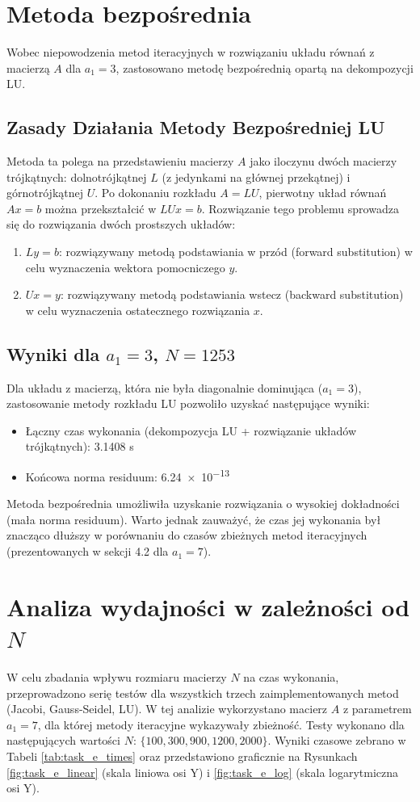 \documentclass[a4paper, 11pt]{article}
\begin{document}
\section{Metoda bezpośrednia}
Wobec niepowodzenia metod iteracyjnych w rozwiązaniu układu równań z macierzą $A$ dla $a_1=3$, zastosowano metodę bezpośrednią opartą na dekompozycji LU.

\subsection{Zasady Działania Metody Bezpośredniej LU}
Metoda ta polega na przedstawieniu macierzy $A$ jako iloczynu dwóch macierzy trójkątnych: dolnotrójkątnej $L$ (z jedynkami na głównej przekątnej) i górnotrójkątnej $U$. Po dokonaniu rozkładu $A = LU$, pierwotny układ równań $Ax=b$ można przekształcić w $LUx=b$. Rozwiązanie tego problemu sprowadza się do rozwiązania dwóch prostszych układów:
\begin{enumerate}
    \item $Ly = b$: rozwiązywany metodą podstawiania w przód (forward substitution) w celu wyznaczenia wektora pomocniczego $y$.
    \item $Ux = y$: rozwiązywany metodą podstawiania wstecz (backward substitution) w celu wyznaczenia ostatecznego rozwiązania $x$.
\end{enumerate}

\subsection{Wyniki dla $a_1=3$, $N=1253$}
Dla układu z macierzą, która nie była diagonalnie dominująca ($a_1=3$), zastosowanie metody rozkładu LU pozwoliło uzyskać następujące wyniki:
\begin{itemize}
    \item Łączny czas wykonania (dekompozycja LU + rozwiązanie układów trójkątnych): \num{3.1408} s
    \item Końcowa norma residuum: \num{6.24e-13}
\end{itemize}
Metoda bezpośrednia umożliwiła uzyskanie rozwiązania o wysokiej dokładności (mała norma residuum). Warto jednak zauważyć, że czas jej wykonania był znacząco dłuższy w porównaniu do czasów zbieżnych metod iteracyjnych (prezentowanych w sekcji 4.2 dla $a_1=7$).

\section{Analiza wydajności w zależności od $N$}
W celu zbadania wpływu rozmiaru macierzy $N$ na czas wykonania, przeprowadzono serię testów dla wszystkich trzech zaimplementowanych metod (Jacobi, Gauss-Seidel, LU). W tej analizie wykorzystano macierz $A$ z parametrem $a_1=7$, dla której metody iteracyjne wykazywały zbieżność. Testy wykonano dla następujących wartości $N$: $\{100, 300, 900, 1200, 2000\}$. Wyniki czasowe zebrano w Tabeli \ref{tab:task_e_times} oraz przedstawiono graficznie na Rysunkach \ref{fig:task_e_linear} (skala liniowa osi Y) i \ref{fig:task_e_log} (skala logarytmiczna osi Y).
\end{document}
